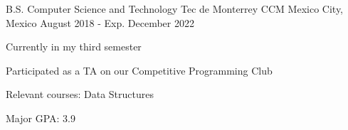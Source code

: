 

\begin{cventries}

  \cventry
    {B.S. Computer Science and Technology} %
    {Tec de Monterrey CCM} %
    {Mexico City, Mexico} %
    {August 2018 - Exp. December 2022} %
    {
      \begin{cvitems} %
        \item {Currently in my third semester}
        \item {Participated as a TA on our Competitive Programming Club}
        \item {Relevant courses: Data Structures}
        \item {Major GPA: 3.9}
      \end{cvitems}
    }

\end{cventries}
